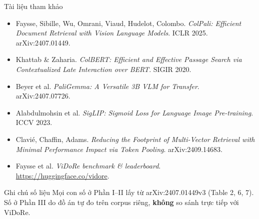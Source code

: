 \documentclass[aspectratio=169,10pt]{beamer}
\begin{document}
\begin{frame}{Tài liệu tham khảo}
  \footnotesize
  \begin{itemize}
    \item Faysse, Sibille, Wu, Omrani, Viaud, Hudelot, Colombo. \emph{ColPali: Efficient Document Retrieval with Vision Language Models}. ICLR 2025. arXiv:2407.01449.
    \item Khattab \& Zaharia. \emph{ColBERT: Efficient and Effective Passage Search via Contextualized Late Interaction over BERT}. SIGIR 2020.
    \item Beyer et al. \emph{PaliGemma: A Versatile 3B VLM for Transfer}. arXiv:2407.07726.
    \item Alabdulmohsin et al. \emph{SigLIP: Sigmoid Loss for Language Image Pre-training}. ICCV 2023.
    \item Clavié, Chaffin, Adams. \emph{Reducing the Footprint of Multi-Vector Retrieval with Minimal Performance Impact via Token Pooling}. arXiv:2409.14683.
    \item Faysse et al. \emph{ViDoRe benchmark \& leaderboard}. \url{https://huggingface.co/vidore}.
  \end{itemize}

  \vspace{3mm}
  \begin{block}{\small Ghi chú số liệu}
    \footnotesize
    Mọi con số ở Phần I--II lấy từ arXiv:2407.01449v3 (Table 2, 6, 7).
    Số ở Phần III do đồ án tự đo trên corpus riêng, \textbf{không} so sánh trực tiếp với ViDoRe.
  \end{block}
\end{frame}
\end{document}
